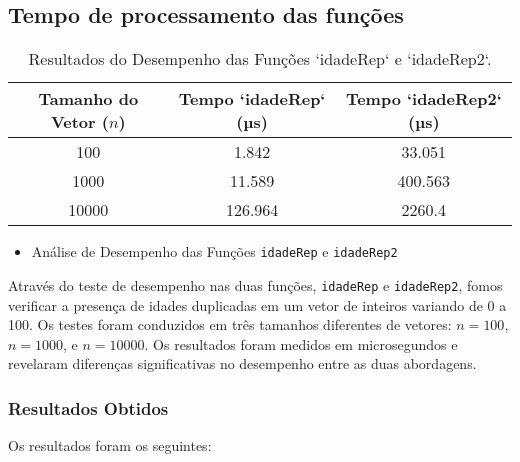 \subsection{Tempo de processamento das funções}

\begin{table}[ht]
    \centering
    \caption{Resultados do Desempenho das Funções `idadeRep` e `idadeRep2`.}
    \begin{tabular}{@{}ccc@{}}
        \toprule
        Tamanho do Vetor (\(n\)) & Tempo `idadeRep` (µs) & Tempo `idadeRep2` (µs) \\ \midrule
        100       & 1.842               & 33.051               \\
        1000      & 11.589              & 400.563              \\
        10000     & 126.964             & 2260.4               \\ \bottomrule
    \end{tabular}
\end{table}

\begin{itemize}
    \item Análise de Desempenho das Funções \texttt{idadeRep} e \texttt{idadeRep2}
\end{itemize}
Através do teste de desempenho nas duas funções, \texttt{idadeRep} e \texttt{idadeRep2}, fomos verificar a presença de idades duplicadas em um vetor de inteiros variando de 0 a 100. Os testes foram conduzidos em três tamanhos diferentes de vetores: \( n = 100 \), \( n = 1000 \), e \( n = 10000 \). Os resultados foram medidos em microsegundos e revelaram diferenças significativas no desempenho entre as duas abordagens.

\subsubsection{Resultados Obtidos}
Os resultados foram os seguintes:

